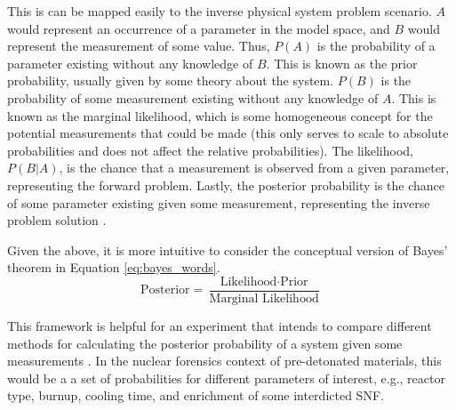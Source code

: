 This is can be mapped easily to the inverse physical system problem scenario.
$A$ would represent an occurrence of a parameter in the model space, and $B$
would represent the measurement of some value. Thus, $P(A)$ is the probability
of a parameter existing without any knowledge of $B$. This is known as the
prior probability, usually given by some theory about the system. $P(B)$ is the
probability of some measurement existing without any knowledge of $A$. This is
known as the marginal likelihood, which is some homogeneous concept for the
potential measurements that could be made (this only serves to scale to
absolute probabilities and does not affect the relative probabilities). The
likelihood, $P(B|A)$, is the chance that a measurement is observed from a given
parameter, representing the forward problem.  Lastly, the posterior probability
is the chance of some parameter existing given some measurement, representing
the inverse problem solution \cite{inverse_theory, gentle_bayes}.  

Given the above, it is more intuitive to consider the conceptual version of
Bayes' theorem in Equation \ref{eq:bayes_words}.
\begin{equation}
  \label{eq:bayes_words}
  \text{Posterior} = \frac{\text{Likelihood} \cdot \text{Prior}}
                          {\text{Marginal \ Likelihood}} 
\end{equation} 

This framework is helpful for an experiment that intends to compare different
methods for calculating the posterior probability of a system given some
measurements \cite{bayes_compare}.  In the nuclear forensics context of
pre-detonated materials, this would be a a set of probabilities for different
parameters of interest, e.g., reactor type, burnup, cooling time, and
enrichment of some interdicted \gls{SNF}.


